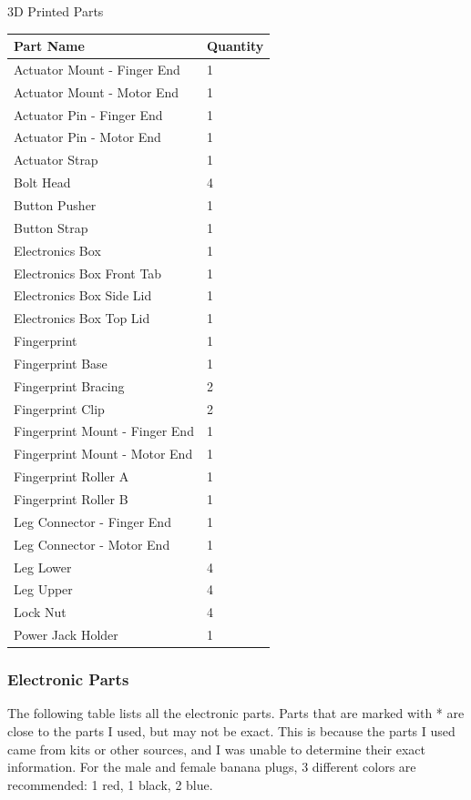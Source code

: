 \documentclass[letterpaper,10pt,english]{sphinxmanual}
\begin{document}
\begin{threeparttable}
\capstart\caption{3D Printed Parts}
\label{NARFSTR:id3}
\begin{tabulary}{\linewidth}{|L|L|}
\hline
\textsf{\relax 
Part Name
} & \textsf{\relax 
Quantity
}\\
\hline
Actuator Mount - Finger End
 & 
1
\\
\hline
Actuator Mount - Motor End
 & 
1
\\
\hline
Actuator Pin - Finger End
 & 
1
\\
\hline
Actuator Pin - Motor End
 & 
1
\\
\hline
Actuator Strap
 & 
1
\\
\hline
Bolt Head
 & 
4
\\
\hline
Button Pusher
 & 
1
\\
\hline
Button Strap
 & 
1
\\
\hline
Electronics Box
 & 
1
\\
\hline
Electronics Box Front Tab
 & 
1
\\
\hline
Electronics Box Side Lid
 & 
1
\\
\hline
Electronics Box Top Lid
 & 
1
\\
\hline
Fingerprint
 & 
1
\\
\hline
Fingerprint Base
 & 
1
\\
\hline
Fingerprint Bracing
 & 
2
\\
\hline
Fingerprint Clip
 & 
2
\\
\hline
Fingerprint Mount - Finger End
 & 
1
\\
\hline
Fingerprint Mount - Motor End
 & 
1
\\
\hline
Fingerprint Roller A
 & 
1
\\
\hline
Fingerprint Roller B
 & 
1
\\
\hline
Leg Connector - Finger End
 & 
1
\\
\hline
Leg Connector - Motor End
 & 
1
\\
\hline
Leg Lower
 & 
4
\\
\hline
Leg Upper
 & 
4
\\
\hline
Lock Nut
 & 
4
\\
\hline
Power Jack Holder
 & 
1
\\
\hline\end{tabulary}

\end{threeparttable}



\subsubsection{Electronic Parts}
\label{NARFSTR:electronic-parts}
The following table lists all the electronic parts. Parts that are marked with * are close to the parts I used, but may not be exact. This is because the parts I used came from kits or other sources, and I was unable to determine their exact information. For the male and female banana plugs, 3 different colors are recommended: 1 red, 1 black, 2 blue.
\end{document}
